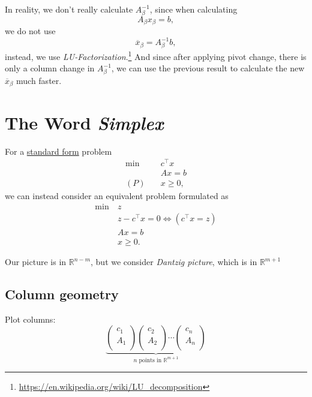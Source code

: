 \begin{note}
	In reality, we don't really calculate \(A^{-1}_{\beta}\), since when calculating
	\[
		A_{\beta}x_{\beta} = b,
	\]
	we do not use
	\[
		\overline{x}_{\beta} = A^{-1}_{\beta}b,
	\]
	instead, we use \emph{LU-Factorization}.\footnote{\url{https://en.wikipedia.org/wiki/LU_decomposition}} And since after applying pivot change,
	there is only a column change in \(A^{-1}_{\beta}\), we can use the previous result
	to calculate the new \(\overline{x}_{\beta}\) much faster.
\end{note}

\section{The Word \emph{Simplex}}
For a \hyperref[def:standard-form]{standard form} problem
\[
	\begin{aligned}
		\min~    & c^{\top}x \\
		         & Ax = b    \\
		(P)\quad & x\geq 0,
	\end{aligned}
\]
we can instead consider an equivalent problem formulated as
\[
	\begin{aligned}
		\min~ & z                                        \\
		      & z - c^{\top} x = 0 \iff (c^{\top} x = z) \\
		      & Ax = b                                   \\
		      & x\geq 0.
	\end{aligned}
\]

\begin{prev}
	Our picture is in \(\mathbb{R}^{n-m}\), but we consider \emph{Dantzig picture}, which is in \(\mathbb{R}^{m+1}\)
\end{prev}

\subsection{Column geometry}
Plot columns:
\[
	\underbrace{
		\begin{pmatrix}
			c_1 \\
			A_1 \\
		\end{pmatrix}
		\begin{pmatrix}
			c_2 \\
			A_2 \\
		\end{pmatrix}
		\cdots
		\begin{pmatrix}
			c_n \\
			A_n \\
		\end{pmatrix}}_{n \text{ points in }\mathbb{R}^{m+1}}
\]


